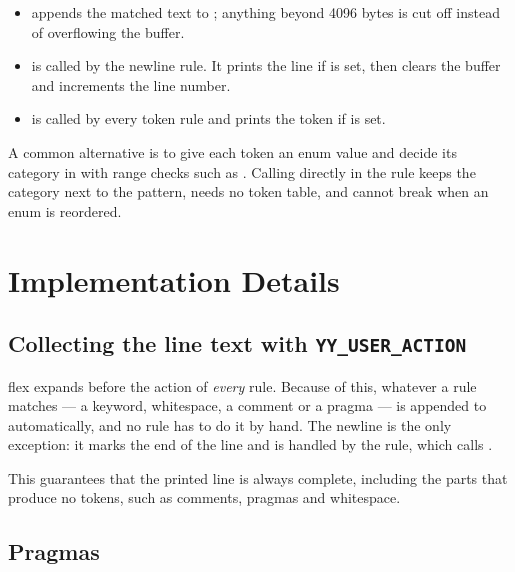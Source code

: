 \documentclass[12pt]{article}
\begin{document}

\begin{itemize}
  \item {} appends the matched text to ; anything beyond 4096 bytes is
        cut off instead of overflowing the buffer.
  \item {} is called by the newline rule. It prints the line if  is set,
        then clears the buffer and increments the line number.
  \item {} is called by every token rule and prints the token if  is set.
\end{itemize}

A common alternative is to give each token an enum value and decide its category in  with
range checks such as . Calling  directly in the
rule keeps the category next to the pattern, needs no token table, and cannot break when an enum is
reordered.

\section{Implementation Details}

\subsection{Collecting the line text with \texttt{YY\_USER\_ACTION}}


flex expands  before the action of \emph{every} rule. Because of this, whatever a
rule matches --- a keyword, whitespace, a comment or a pragma --- is appended to 
automatically, and no rule has to do it by hand. The newline is the only exception: it marks the
end of the line and is handled by the \code{\n} rule, which calls .

This guarantees that the printed line is always complete, including the parts that produce no
tokens, such as comments, pragmas and whitespace.

\subsection{Pragmas}

\end{document}
